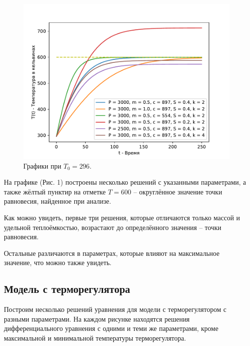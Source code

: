         \begin{figure}[H]
            \centering
            \includegraphics[width=17cm]{pictures/utug1.pdf}
            \caption{Графики при $T_0 = 296$.}
        \end{figure}

        На графике (Рис. 1) построены несколько решений с указанными параметрами, а также жёлтый пунктир на отметке $T = 600$ -- округлённое значение точки равновесия, найденное при анализе.
        
        Как можно увидеть, первые три решения, которые отличаются только массой и удельной теплоёмкостью, возрастают до определённого значения -- точки равновесия. 
        
        Остальные различаются в параметрах, которые влияют на максимальное значение, что можно также увидеть.
    
    \subsection{Модель с терморегулятора}
        Построим несколько решений уравнения для модели с терморегулятором с разными параметрами. На каждом рисунке находятся решения дифференциального уравнения с одними и теми же параметрами, кроме максимальной и минимальной температуры терморегулятора. 


